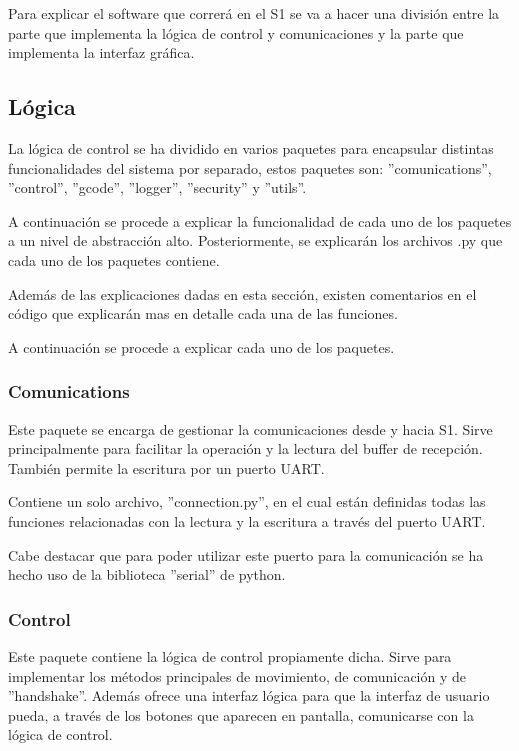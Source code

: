Para explicar el software que correrá en el \ac{S1} se va a hacer una división entre la parte que implementa la lógica de control y comunicaciones y la parte que implementa la interfaz gráfica.

\subsection{Lógica}

La lógica de control se ha dividido en varios paquetes para encapsular distintas funcionalidades del sistema por separado, estos paquetes son: ''comunications'', ''control'', ''gcode'', ''logger'', ''security'' y ''utils''.

A continuación se procede a explicar la funcionalidad de cada uno de los paquetes a un nivel de abstracción alto. Posteriormente, se explicarán los archivos .py que cada uno de los paquetes contiene.

Además de las explicaciones dadas en esta sección, existen comentarios en el código que explicarán mas en detalle cada una de las funciones.

A continuación se procede a explicar cada uno de los paquetes.

\subsubsection{Comunications}
Este paquete se encarga de gestionar la comunicaciones desde y hacia \ac{S1}. Sirve principalmente para facilitar la operación y la lectura del buffer de recepción.
También permite la escritura por un puerto UART.

Contiene un solo archivo, ''connection.py'', en el cual están definidas todas las funciones relacionadas con la lectura y la escritura a través del puerto UART.

Cabe destacar que para poder utilizar este puerto para la comunicación se ha hecho uso de la biblioteca ''serial'' de python.

\subsubsection{Control}

Este paquete contiene la lógica de control propiamente dicha. Sirve para implementar los métodos principales de movimiento, de comunicación y de  ''handshake''. Además ofrece una interfaz lógica para que la interfaz de usuario pueda, a través de los botones que aparecen en pantalla, comunicarse con la lógica de control.

